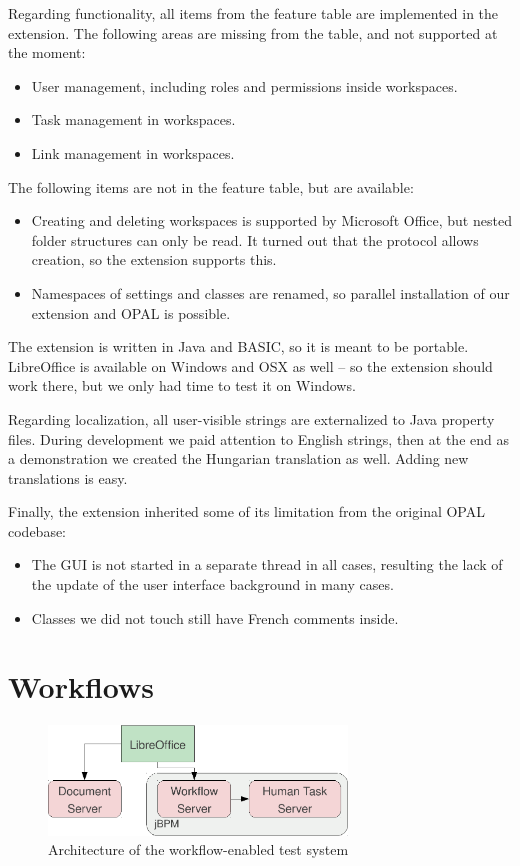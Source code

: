 Regarding functionality, all items from the feature table are implemented in
the extension. The following areas are missing from the table, and not
supported at the moment:

\begin{itemize}
\item User management, including roles and permissions inside workspaces.
\item Task management in workspaces.
\item Link management in workspaces.
\end{itemize}

The following items are not in the feature table, but are available:

\begin{itemize}
\item Creating and deleting workspaces is supported by Microsoft Office, but nested
folder structures can only be read. It turned out that the protocol allows
creation, so the extension supports this.
\item Namespaces of settings and classes are renamed, so parallel installation
of our extension and OPAL is possible.
\end{itemize}

The extension is written in Java and BASIC, so it is meant to be portable.
LibreOffice is available on Windows and OSX as well -- so the extension should
work there, but we only had time to test it on Windows.

Regarding localization, all user-visible strings are externalized to Java
property files. During development we paid attention to English strings, then at
the end as a demonstration we created the Hungarian translation as well. Adding
new translations is easy.

Finally, the extension inherited some of its limitation from the original OPAL
codebase:

\begin{itemize}
\item The GUI is not started in a separate thread in all cases, resulting the
lack of the update of the user interface background in many cases.
\item Classes we did not touch still have French comments inside.
\end{itemize}

\section{Workflows}

\begin{figure}[H]
\centering
\includegraphics[width=300px,keepaspectratio]{test-arch-wf.pdf}
\caption{Architecture of the workflow-enabled test system}
\end{figure}
